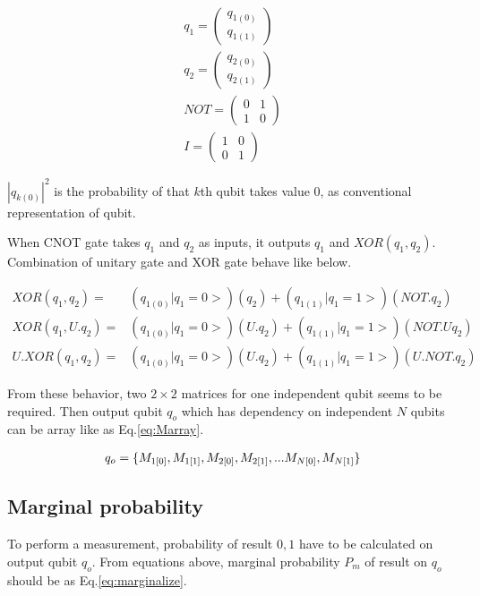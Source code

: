 \documentclass[dvipdfmx]{article}
\begin{document}
\begin{eqnarray}
q_{1} = \left( \begin{array}{c} q_{1(0)} \\ q_{1(1)} \end{array} \right) \\
q_{2} = \left( \begin{array}{c} q_{2(0)} \\ q_{2(1)} \end{array} \right) \\
NOT = \left( \begin{array}{cc} 0 & 1 \\ 1 & 0 \end{array} \right) \\
I = \left( \begin{array}{cc} 1 & 0 \\ 0 & 1 \end{array} \right)
\end{eqnarray}

$|q_{k(0)}|^{2}$ is the probability of that $k$th qubit takes value $0$, as conventional representation of qubit.

When CNOT gate takes $q_{1}$ and $q_{2}$ as inputs, it outputs $q_{1}$ and $XOR(q_{1},q_{2})$.
Combination of unitary gate and XOR gate behave like below.

\begin{eqnarray}
XOR(q_{1}, q_{2}) =&  (q_{1(0)}|q_{1}=0>)(q_{2}) + (q_{1(1)}|q_{1}=1>)(NOT.q_{2}) \\
XOR(q_{1}, U.q_{2}) =& (q_{1(0)}|q_{1}=0>)(U.q_{2}) + (q_{1(1)}|q_{1}=1>)(NOT.U q_{2}) \label{eq:xoru} \\
U.XOR(q_{1}, q_{2}) =& (q_{1(0)}|q_{1}=0>)(U.q_{2}) + (q_{1(1)}|q_{1}=1>)(U.NOT.q_{2}) \label{eq:uxor}
\end{eqnarray}

From these behavior, two $2 \times 2$ matrices for one independent qubit seems to be required.
Then output qubit $q_{o}$ which has dependency on independent $N$ qubits can be array like as Eq.\ref{eq:Marray}.

\begin{eqnarray}
	q_{o} = \{M_{1[0]}, M_{1[1]}}, {M_{2[0]}, M_{2[1]}}, ... {M_{N[0]}, M_{N[1]}\}
	\label{eq:Marray}
\end{eqnarray}


\subsection{Marginal probability}
To perform a measurement, probability of result ${0,1}$ have to be calculated on output qubit $q_{o}$.
From equations above, marginal probability $P_{m}$ of result on $q_{o}$ should be as Eq.\ref{eq:marginalize}.
\end{document}
